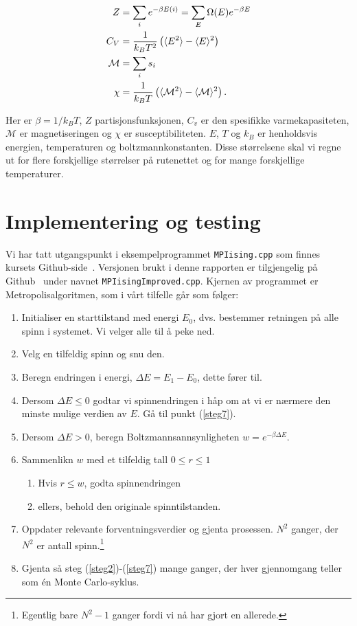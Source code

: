 \documentclass[11pt]{article}
\begin{document}
\begin{align}
Z &= \sum_i e^{-\beta E(i)} = \sum_E \Omega(E) e^{-\beta E}\label{eq:partisjons-funk} \\
C_V &= \frac{ 1 }{ k_B T^2} \left( \langle E^2 \rangle-\langle E \rangle^2 \right)\label{eq:spesifikk-varmekapasitet} \\
\mathcal{M} &= \sum_i s_i\label{eq:magnetisering} \\
\chi &= \frac{ 1 }{ k_BT } \left( \langle \mathcal{M}^2 \rangle - \langle \mathcal{M} \rangle^2 \right)\label{eq:susceptibilitet}.
\end{align}

Her er $\beta = 1/k_BT$, $Z$ partisjonsfunksjonen, $C_v$ er den spesifikke varmekapasiteten,
$\mathcal{M}$ er magnetiseringen og $\chi$ er susceptibiliteten. $E$, $T$ og $k_B$ er henholdsvis 
energien, temperaturen og boltzmannkonstanten. Disse størrelsene skal vi regne ut for flere forskjellige
størrelser på rutenettet og for mange forskjellige temperaturer.


\section{Implementering og testing}

Vi har tatt utgangspunkt i eksempelprogrammet \texttt{MPIising.cpp}
som finnes kursets Github-side~\cite{compphys-github}. Versjonen brukt
i denne rapporten er tilgjengelig på Github~\cite{github-repo} under navnet \texttt{MPIisingImproved.cpp}. Kjernen av
programmet er Metropolisalgoritmen, som i vårt tilfelle går som følger: 

\begin{enumerate}
\item Initialiser en starttilstand med energi $E_0$, dvs. bestemmer retningen på
  alle spinn i systemet. Vi velger alle til å peke ned.
\item Velg en tilfeldig spinn og snu den.\label{steg2}
\item Beregn endringen i energi, $\Delta E = E_1-E_0$, dette fører til.\label{steg3} 
\item Dersom $\Delta E \leq 0$ godtar vi spinnendringen i håp om at vi
  er nærmere den minste mulige verdien av $E$. Gå til punkt (\ref{steg7}).
\item Dersom $\Delta E > 0 $, beregn Boltzmannsannsynligheten $w = e^{-\beta\Delta E}$. 
\item Sammenlikn $w$ med et tilfeldig tall $0\leq r\leq 1$ \label{steg6}
\begin{enumerate}
  \item Hvis $r\leq w$, godta spinnendringen
  \item ellers, behold den originale spinntilstanden.
\end{enumerate}
\item Oppdater relevante forventningsverdier og gjenta prosessen.\label{steg7}
  $N^2$ ganger, der $N^2$ er antall spinn.\footnote{Egentlig bare $N^2-1$ ganger fordi vi nå har gjort en
  allerede.}
\item Gjenta så steg (\ref{steg2})-(\ref{steg7}) mange ganger, der hver gjennomgang teller som
  én Monte Carlo-syklus.
\end{enumerate}
\end{document}
